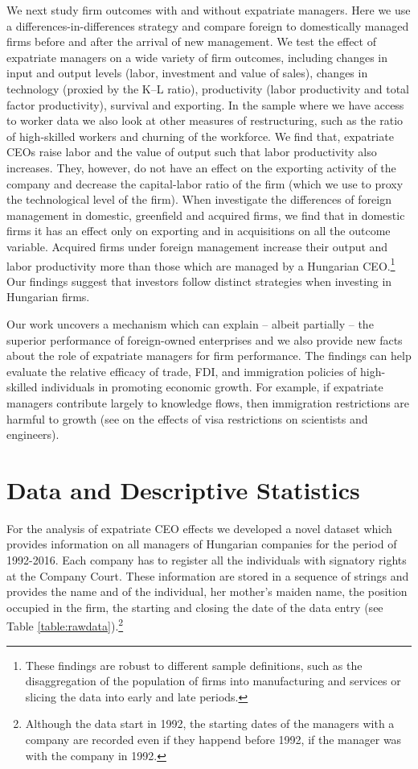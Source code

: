 \documentclass[12pt,a4paper]{article}
\begin{document}
We next study firm outcomes with and without expatriate managers. Here we use a differences-in-differences strategy and compare foreign to domestically managed firms before and after the arrival of new management. We test the effect of expatriate managers on a wide variety of firm outcomes, including changes in input and output levels (labor, investment and value of sales), changes in technology (proxied by the K--L ratio), productivity (labor productivity and total factor productivity), survival and exporting.  In the sample where we have access to worker data we also look at other measures of restructuring, such as the ratio of high-skilled workers and churning of the workforce.  We find that, expatriate CEOs raise labor and the value of output such that labor productivity also increases.  They, however, do not have an effect on the exporting activity of the company and decrease the capital-labor ratio of the firm (which we use to proxy the technological level of the firm). When investigate the differences of foreign management in domestic, greenfield and acquired firms, we find that in domestic firms it has an effect only on exporting and in acquisitions on all the outcome variable.  Acquired firms under foreign management increase their output and labor productivity more than those which are managed by a Hungarian CEO.\footnote{These findings are robust to different sample definitions, such as the disaggregation of the population of firms into manufacturing and services or slicing the data into early and late periods.} Our findings suggest that investors follow distinct strategies when investing in Hungarian firms. 

Our work uncovers a mechanism which can explain -- albeit partially -- the superior performance of foreign-owned enterprises and we also provide new facts about the role of expatriate managers for firm performance. The  findings can help evaluate the relative efficacy of trade, FDI, and immigration policies of high-skilled individuals in promoting economic growth. For example, if expatriate managers contribute largely to knowledge flows, then immigration restrictions are harmful to growth (see \cite{Kerr2010-le} on the effects of visa restrictions on scientists and engineers). 

\section{Data and Descriptive Statistics}
For the analysis of expatriate CEO effects we developed a novel dataset which provides information on all managers of Hungarian companies for the period of 1992-2016. Each company has to register all the individuals with signatory rights at the Company Court. These information are stored in a sequence of strings and provides the name and of the individual, her mother's maiden name, the position occupied in the firm, the starting and closing the date of the data entry (see Table \ref{table:rawdata}).\footnote{Although the data start in 1992, the starting dates of the managers with a company are recorded even if they happend before 1992, if the manager was with the company in 1992.}
\end{document}
